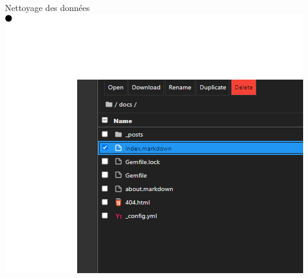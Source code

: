 \documentclass{beamer}
\begin{document}
\begin{frame}{Nettoyage des données}
    \includegraphics[width=\textwidth]{assets/test.png} %
\end{frame}
\end{document}
